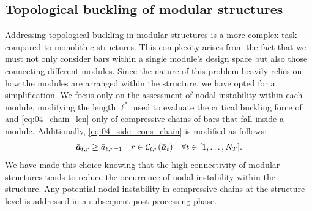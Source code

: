 \subsection{Topological buckling of modular structures}
Addressing topological buckling in modular structures is a more complex task compared to monolithic structures. This complexity arises from the fact that we must not only consider bars within a single module's design space but also those connecting different modules. Since the nature of this problem heavily relies on how the modules are arranged within the structure, we have opted for a simplification.  We focus only on the assessment of nodal instability within each module, modifying the length $\ell^*$ used to evaluate the critical buckling force of  and \eqref{eq:04_chain_len} only of compressive chains of bars that fall inside a module. Additionally, \eqref{eq:04_side_cons_chain} is modified as follows:
\begin{equation}\label{eq:05_side_cons_chain_modular}
    \bar{\bm{a}}_{t,r} \geq \bar{a}_{t,r=1} \quad r \in \mathcal{C}_{l,r}(\bar{\bm{a}}_t) \quad \forall t \in [1,\dots,N_T].
\end{equation}
We have made this choice knowing that the high connectivity of modular structures tends to reduce the occurrence of nodal instability within the structure. Any potential nodal instability in compressive chains at the structure level is addressed in a subsequent post-processing phase.

